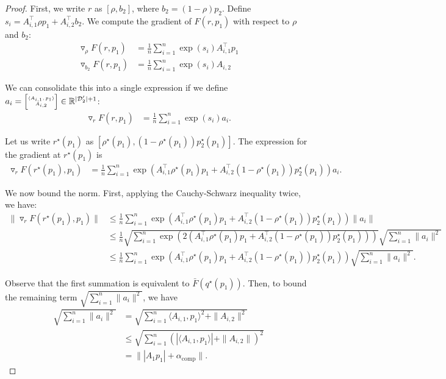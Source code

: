 \documentclass[table]{ai2style/ai2}
\newcommand{\D}[0]{\mathcal{D}}
\newcommand{\R}[0]{\mathbb{R}}
\newcommand\SmallMatrix[1]{{
\tiny\arraycolsep=0.3\arraycolsep\ensuremath{\begin{bmatrix}#1\end{bmatrix}}}}
\newcommand{\alphacomp}[0]{\alpha_{\text{comp}}}
\begin{document}
\begin{proof}

First, we write $r$ as $[\rho, b_2]$, where $b_2 = (1 - \rho)p_2$. Define $s_i = A_{i, 1}^\top \rho p_1 + A_{i, 2}^\top b_2$. We compute the gradient of $F(r, p_1)$ with respect to $\rho$ and $b_2$:
\begin{align*}
    \triangledown_{\rho} F(r, p_1) &= \frac{1}{n} \sum_{i = 1}^n \exp(s_i) A_{i, 1}^\top p_1 \\
    \triangledown_{b_2} F(r, p_1) &= \frac{1}{n} \sum_{i = 1}^n \exp(s_i) A_{i, 2}
\end{align*}

We can consolidate this into a single expression if we define $a_i = \SmallMatrix{ \langle A_{i, 1}, p_1 \rangle \\ A_{i, 2}} \in \R^{|\D_2'| + 1}$:
\begin{align*}
    \triangledown_{r} F(r, p_1) &= \frac{1}{n} \sum_{i = 1}^n \exp(s_i) a_i.
\end{align*}

Let us write $r^\star(p_1)$ as $[\rho^\star(p_1), (1 - \rho^\star(p_1)) p_2^\star(p_1)]$. The expression for the gradient at $r^\star(p_1)$ is
\begin{align*}
    \triangledown_r F(r^\star(p_1), p_1) &= \frac{1}{n}\sum_{i = 1}^n \exp(A_{i, 1}^\top \rho^\star(p_1) p_1 + A_{i, 2}^\top (1 - \rho^\star(p_1)) p_2^\star(p_1)) a_i.
\end{align*}

We now bound the norm. First, applying the Cauchy-Schwarz inequality twice, we have:
\begin{align*}
    \|\triangledown_r F(r^\star(p_1), p_1)\| &\le \frac{1}{n} \sum_{i = 1}^n \exp(A_{i, 1}^\top \rho^\star(p_1) p_1 + A_{i, 2}^\top (1 - \rho^\star(p_1)) p_2^\star(p_1)) \|a_i\| \\
    &\le \frac{1}{n} \sqrt{\sum_{i = 1}^n \exp(2(A_{i, 1}^\top \rho^\star(p_1) p_1 + A_{i, 2}^\top (1 - \rho^\star(p_1)) p_2^\star(p_1)))} \sqrt{\sum_{i = 1}^n \| a_i\|^2} \\
    &\le \frac{1}{n} \sum_{i = 1}^n \exp(A_{i, 1}^\top \rho^\star(p_1) p_1 + A_{i, 2}^\top (1 - \rho^\star(p_1)) p_2^\star(p_1)) \sqrt{\sum_{i = 1}^n \| a_i\|^2}.
\end{align*}

Observe that the first summation is equivalent to $\bar{F}(q^\star(p_1))$. Then, to bound the remaining term $\sqrt{\sum_{i = 1}^n \| a_i\|^2}$, we have
\begin{align*}
\sqrt{\sum_{i = 1}^n \| a_i\|^2} &= \sqrt{\sum_{i = 1}^n \langle A_{i, 1}, p_1 \rangle^2 + \| A_{i, 2}\|^2 } \\
&\le \sqrt{\sum_{i = 1}^n (|\langle A_{i, 1}, p_1 \rangle| + \| A_{i, 2}\|)^2 } \\
&= \big\| | A_1 p_1 | + \alphacomp \big\|.
\end{align*}


\end{proof}
\end{document}
